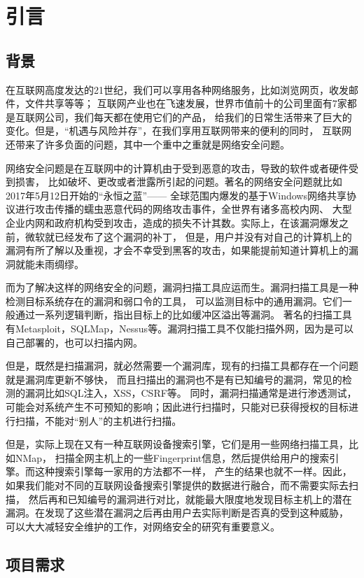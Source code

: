 \chapter{引言}
\label{cha:intro}

\section{背景}
在互联网高度发达的21世纪，我们可以享用各种网络服务，比如浏览网页，收发邮件，文件共享等等；
互联网产业也在飞速发展，世界市值前十的公司里面有7家都是互联网公司，我们每天都在使用它们的产品，
给我们的日常生活带来了巨大的变化。但是，“机遇与风险并存”，在我们享用互联网带来的便利的同时，
互联网还带来了许多负面的问题，其中一个重中之重就是网络安全问题。

网络安全问题是在互联网中的计算机由于受到恶意的攻击，导致的软件或者硬件受到损害，
比如破坏、更改或者泄露所引起的问题。著名的网络安全问题就比如2017年5月12日开始的“永恒之蓝”——
全球范围内爆发的基于Windows网络共享协议进行攻击传播的蠕虫恶意代码的网络攻击事件，全世界有诸多高校内网、
大型企业内网和政府机构受到攻击，造成的损失不计其数。实际上，在该漏洞爆发之前，微软就已经发布了这个漏洞的补丁，
但是，用户并没有对自己的计算机上的漏洞有所了解以及重视，才会不幸受到黑客的攻击，如果能提前知道计算机上的漏洞就能未雨绸缪。

而为了解决这样的网络安全的问题，漏洞扫描工具应运而生。漏洞扫描工具是一种检测目标系统存在的漏洞和弱口令的工具，
可以监测目标中的通用漏洞。它们一般通过一系列逻辑判断，指出目标上的比如缓冲区溢出等漏洞。
著名的扫描工具有Metasploit，SQLMap，Nessus等。漏洞扫描工具不仅能扫描外网，因为是可以自己部署的，也可以扫描内网。

但是，既然是扫描漏洞，就必然需要一个漏洞库，现有的扫描工具都存在一个问题就是漏洞库更新不够快，
而且扫描出的漏洞也不是有已知编号的漏洞，常见的检测的漏洞比如SQL注入，XSS，CSRF等。
同时，漏洞扫描通常是进行渗透测试，可能会对系统产生不可预知的影响；因此进行扫描时，只能对已获得授权的目标进行扫描，不能对“别人”的主机进行扫描。

但是，实际上现在又有一种互联网设备搜索引擎，它们是用一些网络扫描工具，比如NMap，
扫描全网主机上的一些Fingerprint信息，然后提供给用户的搜索引擎。而这种搜索引擎每一家用的方法都不一样，
产生的结果也就不一样。因此，如果我们能对不同的互联网设备搜索引擎提供的数据进行融合，而不需要实际去扫描，
然后再和已知编号的漏洞进行对比，就能最大限度地发现目标主机上的潜在漏洞。在发现了这些潜在漏洞之后再由用户去实际判断是否真的受到这种威胁，
可以大大减轻安全维护的工作，对网络安全的研究有重要意义。


\section{项目需求}
\label{sec:requirements}

